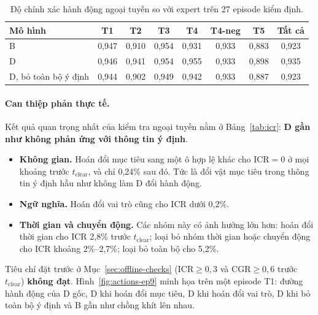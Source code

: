 \begin{table}[htbp]
  \centering
  \caption{Độ chính xác hành động ngoại tuyến so với expert trên 27 episode kiểm định.}
  \label{tab:offline-accuracy}
  \begin{tabular}{@{}lccccccc@{}}
    \toprule
    \textbf{Mô hình} & \textbf{T1} & \textbf{T2} & \textbf{T3} & \textbf{T4} & \textbf{T4-neg} & \textbf{T5} & \textbf{Tất cả} \\
    \midrule
    B                       & 0,947 & 0,910 & 0,954 & 0,931 & 0,933 & 0,883 & 0,923 \\
    D                       & 0,946 & 0,941 & 0,954 & 0,955 & 0,933 & 0,898 & 0,935 \\
    D, bỏ toàn bộ ý định    & 0,944 & 0,902 & 0,949 & 0,942 & 0,933 & 0,887 & 0,923 \\
    \bottomrule
  \end{tabular}
\end{table}

\paragraph{Can thiệp phản thực tế.} Kết quả quan trọng nhất của kiểm tra ngoại tuyến nằm ở Bảng~\ref{tab:icr}: \textbf{D gần như không phản ứng với thông tin ý định}.
\begin{itemize}
  \item \textbf{Không gian.} Hoán đổi mục tiêu sang một ô hợp lệ khác cho $\text{ICR} = 0$ ở mọi khoảng trước $t_\text{clear}$, và chỉ 0,24\% sau đó. Tức là đổi vật mục tiêu trong thông tin ý định hầu như không làm D đổi hành động.
  \item \textbf{Ngữ nghĩa.} Hoán đổi vai trò cũng cho ICR dưới 0,2\%.
  \item \textbf{Thời gian và chuyển động.} Các nhóm này có ảnh hưởng lớn hơn: hoán đổi thời gian cho ICR 2,8\% trước $t_\text{clear}$; loại bỏ nhóm thời gian hoặc chuyển động cho ICR khoảng 2\%--2,7\%; loại bỏ toàn bộ cho 5,2\%.
\end{itemize}
Tiêu chí đặt trước ở Mục~\ref{sec:offline-checks} ($\text{ICR} \geq 0{,}3$ và $\text{CGR} \geq 0{,}6$ trước $t_\text{clear}$) \textbf{không đạt}. Hình~\ref{fig:actions-ep9} minh họa trên một episode T1: đường hành động của D gốc, D khi hoán đổi mục tiêu, D khi hoán đổi vai trò, D khi bỏ toàn bộ ý định và B gần như chồng khít lên nhau.

